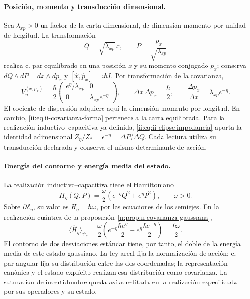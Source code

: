 \paragraph{Posición, momento y transducción dimensional.}
Sea \(\lambda_{xp}>0\) un factor de la carta dimensional, de dimensión
momento por unidad de longitud. La transformación
\[
 Q=\sqrt{\lambda_{xp}}\,x,\qquad
 P=\frac{p_x}{\sqrt{\lambda_{xp}}}
\]
realiza el par equilibrado en una posición \(x\) y su momento conjugado
\(p_x\); conserva \(dQ\wedge dP=dx\wedge dp_x\) y
\([\widehat x,\widehat p_x]=i\hbar I\). Por transformación de la
covarianza,
\begin{equation}
 V_\eta^{(x,p_x)}=\frac{\hbar}{2}
 \begin{pmatrix}e^\eta/\lambda_{xp}&0\\
                 0&\lambda_{xp}e^{-\eta}\end{pmatrix},\qquad
 \Delta x\,\Delta p_x=\frac{\hbar}{2},\qquad
 \frac{\Delta p_x}{\Delta x}=\lambda_{xp}e^{-\eta}.
 \label{ii:eq:ii-covarianza-dimensiones}
\end{equation}
El cociente de dispersión adquiere aquí la dimensión momento por longitud.
En cambio, \eqref{ii:eq:ii-covarianza-forma} pertenece a la carta equilibrada.
Para la realización inductivo--capacitiva ya definida,
\eqref{ii:eq:ii-elipse-impedancia} aporta la identidad adimensional
\(Z_\eta/Z_*=e^{-\eta}=\Delta P/\Delta Q\).
Cada lectura utiliza su transducción declarada y conserva el mismo
determinante de acción.

\paragraph{Energía del contorno y energía media del estado.}
La realización inductivo--capacitiva tiene el Hamiltoniano
\[
 H_\eta(Q,P)=\frac{\omega}{2}
 \left(e^{-\eta}Q^2+e^\eta P^2\right),\qquad \omega>0.
\]
Sobre \(\partial\mathcal E_\eta\), su valor es
\(H_\eta=\hbar\omega\), por las ecuaciones de los semiejes. En la
realización cuántica de la proposición~\ref{ii:prop:ii-covarianza-gaussiana},
\begin{equation}
 \langle\widehat H_\eta\rangle_{\psi_\eta}
 =\frac{\omega}{2}
 \left(e^{-\eta}\frac{\hbar e^\eta}{2}
       +e^\eta\frac{\hbar e^{-\eta}}{2}\right)
 =\frac{\hbar\omega}{2}.
 \label{ii:eq:ii-energia-contorno-covarianza}
\end{equation}
El contorno de dos desviaciones estándar tiene, por tanto, el doble de la
energía media de este estado gaussiano. La ley areal fija la normalización
de acción; el par angular fija su distribución entre las dos coordenadas;
la representación canónica y el estado explícito realizan esa distribución
como covarianza. La saturación de incertidumbre queda así acreditada en
la realización especificada por sus operadores y su estado.
